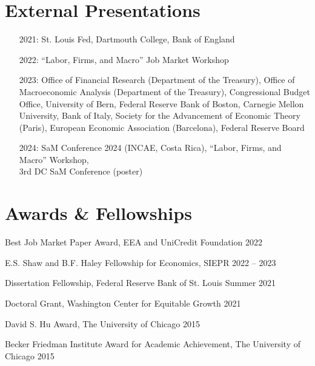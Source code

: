 \documentclass[margin,line]{res}                          %
\newenvironment{list1}{
	\begin{list}{\ding{113}}{%
			\setlength{\itemsep}{0in}
			\setlength{\parsep}{0in} \setlength{\parskip}{0in}
			\setlength{\topsep}{0in} \setlength{\partopsep}{0in}
			\setlength{\leftmargin}{0.17in}}}{\end{list}}
\begin{document}
\begin{resume}
	\section{\sc External Presentations}
	\begin{list1}
		\item[]
		\begin{itemize}\setlength{\itemindent}{.3cm}
			\item[2021:]\makebox[0.1cm]{\hfill} St. Louis Fed, Dartmouth College, Bank of England\smallskip
			\item[2022:]\makebox[0.1cm]{\hfill} ``Labor, Firms, and Macro'' Job Market Workshop \smallskip
			\item[2023:]\makebox[0.1cm]{\hfill} Office of Financial Research (Department of the Treasury), Office of Macroeconomic \hspace*{0.55cm}Analysis (Department of the Treasury), Congressional Budget Office, University of Bern, \hspace*{0.55cm}Federal Reserve Bank of Boston, Carnegie Mellon University, Bank of Italy,  Society for \hspace*{0.55cm}the Advancement of Economic Theory (Paris), European Economic Association (Barcelona),
			\hspace*{0.55cm}Federal Reserve Board\smallskip
			\item[2024:]\makebox[0.1cm]{\hfill} SaM Conference 2024 (INCAE, Costa Rica), ``Labor, Firms, and Macro'' Workshop,\\ 
			\hspace*{0.55cm}3rd DC SaM Conference (poster)\smallskip
		\end{itemize}		
	\end{list1}


	\section{\sc Awards \& Fellowships}
	\begin{list1}
		\item[] Best Job Market Paper Award, EEA and UniCredit Foundation
		\hfill 2022\smallskip
		\item[] E.S. Shaw and B.F. Haley Fellowship for Economics, SIEPR \hfill 2022 -- 2023\smallskip
		\item[] Dissertation Fellowship, Federal Reserve Bank of St. Louis  \hfill Summer 2021\smallskip
		\item[] Doctoral Grant, Washington Center for Equitable Growth \hfill 2021\smallskip
		\item[] David S. Hu Award, The University of Chicago \hfill 2015\smallskip
		\item[] Becker Friedman Institute Award for Academic Achievement, The University of Chicago \hfill 2015\smallskip
	\end{list1}
	

\end{resume}
\end{document}
